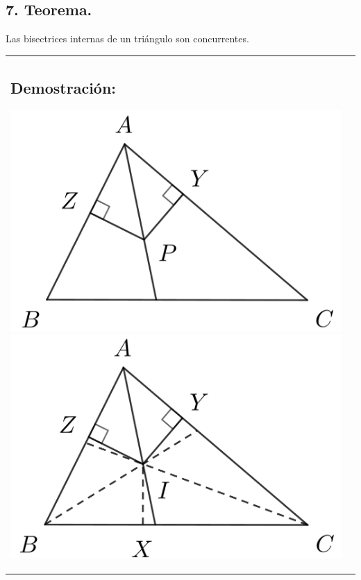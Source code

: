 \documentclass[12pt,a4paper]{article}
\begin{document}
\subsection*{7. Teorema.}
Las bisectrices internas de un triángulo son concurrentes.
\\
\begin{tabular}{p{15.9cm}p{1cm}}
\subsection*{Demostración:}
\begin{center}
\includegraphics[scale=0.5]{Imagenes/bisectriz.png} 
\includegraphics[scale=0.5]{Imagenes/bisectriz1.png} 
\end{center}
\end{tabular}
\\
\end{document}
